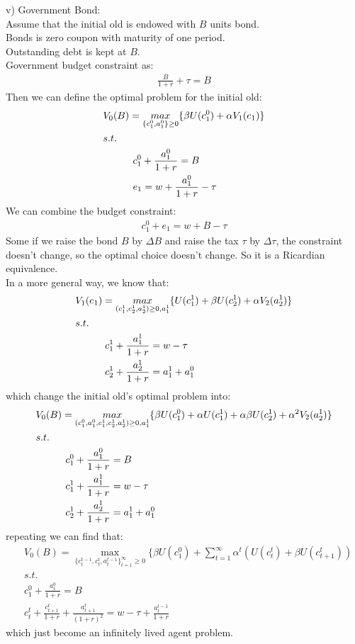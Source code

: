 \documentclass{article}
\begin{document}
\indent v) Government Bond:\\
\indent\indent Assume that the initial old is endowed with $B$ units bond.\\
\indent\indent Bonds is zero coupon with maturity of one period.\\
\indent\indent Outstanding debt is kept at $B$.\\
\indent\indent Government budget constraint as:
	\begin{align*}
		\frac{B}{1 + r} + \tau = B
	\end{align*}
Then we can define the optimal problem for the initial old:
	\begin{align*}
		&V_0(B) = \mathop{max}\limits_{\{c^0_1, a^0_1\} \geq 0} \{\beta U(c^0_1) + \alpha V_1(e_1)\}\\
		&s.t.\\
		&\indent\indent c^0_1 + \frac{a^0_1}{1 + r} = B\\
		&\indent\indent e_1 = w + \frac{a^0_1}{1 + r} - \tau
	\end{align*}
We can combine the budget constraint:
	\begin{align*}
		c^0_1 + e_1 = w + B - \tau
	\end{align*}
Some if we raise the bond $B$ by $\Delta B$ and raise the tax $\tau$ by $\Delta \tau$, the constraint doesn't change, so the optimal choice doesn't change. So it is a Ricardian equivalence.\\
In a more general way, we know that:
	\begin{align*}
		&V_1(e_1) = \mathop{max}\limits_{(c^1_1, c^1_2, a^1_2) \geq0, a^1_1} \{U(c^1_1) + \beta U(c^1_2) + \alpha V_2(a^1_2)\}\\
		&s.t.\\
		&\indent\indent c^1_1 + \frac{a^1_1}{1 + r} = w - \tau\\
		&\indent\indent c^1_2 + \frac{a^1_2}{1 + r} = a^1_1 + a^0_1
	\end{align*} 
which change the initial old's optimal problem into:
	\begin{align*}
		&V_0(B) = \mathop{max}\limits_{(c^0_1, a^0_1, c^1_1, c^1_2, a^1_2) \geq0, a^1_1} \{\beta U(c^0_1) + \alpha U(c^1_1) + \alpha \beta U(c^1_2) + \alpha^2 V_2(a^1_2)\}\\
		&s.t.\\
		&\indent\indent c^0_1 + \frac{a^0_1}{1 + r} = B\\
		&\indent\indent c^1_1 + \frac{a^1_1}{1 + r} = w - \tau\\
		&\indent\indent c^1_2 + \frac{a^1_2}{1 + r} = a^1_1 + a^0_1
	\end{align*}
repeating we can find that:
	\begin{align*}
		&V_0(B) = \mathop{max}\limits_{\{c^{t-1}_t, c^t_t, a^{t-1}_t\}^\infty_{t=1} \geq 0} \{\beta U(c^0_1) + \sum\limits^\infty_{t=1} \alpha^t(U(c^t_t) + \beta U(c^t_{t+1}))\\
		&s.t.\\
		&c^0_1 + \frac{a^0_1}{1 + r} = B\\
		&c^t_t + \frac{c^t_{t+1}}{1 + r} + \frac{a^t_{t+1}}{(1 + r)^2} = w - \tau + \frac{a^{t-1}_t}{1 + r}
	\end{align*}
which just become an infinitely lived agent problem.
\end{document}
